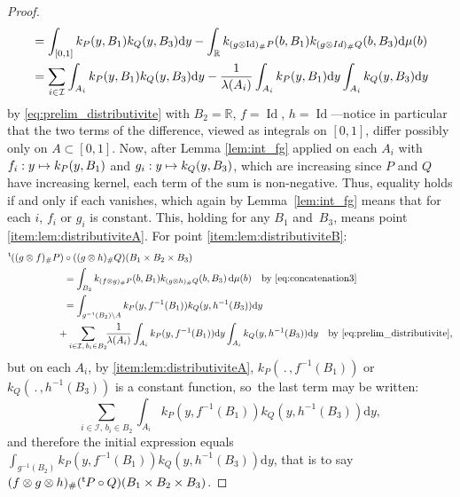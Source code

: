 \documentclass[11pt]{article}
\newcommand\mto{\mathchoice{\longmapsto}{\mapsto}{\mapsto}{\mapsto}}
\theoremstyle{plain}
\theoremstyle{definition}
\newcommand{\dd}{\mathrm{d}}
\newcommand{\Id}{\operatorname{Id}}
\newcommand{\trans}{{}^{\mathrm{t}}\mkern-1mu}
\newcommand{\la}{\lambda}
\newcommand{\R}{\mathbb{R}}
\begin{document}
\begin{proof}
\begin{align*}
&=\int_{[0,1]}k_{P}(y,B_1)k_Q(y,B_3)\dd y-\int_{\R}k_{(g\otimes \Id)_\#P}(b,B_1)k_{(g \otimes {\rm Id})_\#Q}(b,B_3)\dd\mu(b)\\
&=\sum_{i\in\mathcal{I}}\int_{A_i}k_{P}(y,B_1)k_{Q}(y,B_3)\dd y-\frac1{\la(A_i)}\int_{A_i}k_{P}(y,B_1)\dd y\int_{A_i}k_{Q}(y,B_3)\dd y
\end{align*}
by \eqref{eq:prelim_distributivite} with $B_2=\R$, $f=\Id$, $h=\Id$---notice in particular that the two terms of the difference, viewed as integrals on $[0,1]$, differ possibly only on $A\subset[0,1]$. Now, after Lemma \ref{lem:int_fg} applied on each $A_i$ with $f_i:y\mto k_{P}(y,B_1)$ and $g_i:y\mto k_{Q}(y,B_3)$, which are increasing since $P$ and $Q$ have increasing kernel, each term of the sum is non-negative. Thus, equality holds if and only if each vanishes, which again by Lemma~\ref{lem:int_fg} means that for each $i$, $f_i$ or $g_i$ is constant. This, holding for any $B_1$ and~$B_3$, means point \eqref{item:lem:distributiviteA}. For point \eqref{item:lem:distributiviteB}:\vspace*{-3pt}
\begin{align*}
\trans((g\otimes f)_\# P)&\circ ((g \otimes h)_\#Q)(B_1\times B_2\times B_3)\\
&=\int_{B_2} k_{(f\otimes g)_\#P}(b,B_1)k_{(g\otimes h)_\#Q}(b,B_3)\,\dd \mu(b)\quad\text{by \eqref{eq:concatenation3}}\\
&=\int_{g^{-1}(B_2)\setminus A} k_{P}(y,f^{-1}(B_1))k_{Q}(y,h^{-1}(B_3))\dd y\\
&\!\!\!\!+\sum_{i\in \mathcal{I},\,b_i\in B_2}\!\!\frac1{\la(A_i)}\int_{A_i}k_{P}(y,f^{-1}(B_1))\dd y\int_{A_i}k_{Q}(y,h^{-1}(B_3))\dd y\quad\text{by \eqref{eq:prelim_distributivite},}
\end{align*}
but on each $A_i$, by \eqref{item:lem:distributiviteA}, $k_{P}(\,.\,,f^{-1}(B_1))$ or $k_{Q}(\,.\,,h^{-1}(B_3))$ is a constant function, so~the last term may be written:\vspace*{-3pt}
\[\sum_{i\in \mathcal{I},\,b_i\in B_2}\!\int_{A_i}k_{P}(y,f^{-1}(B_1))k_{Q}(y,h^{-1}(B_3))\dd y,\]
and therefore the initial expression equals $\int_{g^{-1}(B_2)} k_{P}(y,f^{-1}(B_1))k_{Q}(y,h^{-1}(B_3))\dd y$, that is to say $(f\otimes g \otimes h)_\#(\trans P\circ Q)(B_1\times B_2\times B_3)$.
\end{proof}
\end{document}
